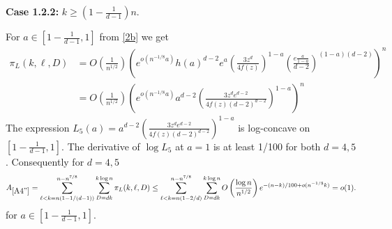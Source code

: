 \documentclass[11pt]{article}
\def\p{\pi}
\newcommand{\brac}[1]{\left(#1\right)}
\newcommand{\bfrac}[2]{\brac{\frac{#1}{#2}}}
\newcommand{\beq}[1]{\begin{equation}\label{#1}}
\newcommand{\eeq}{\end{equation}}
\begin{document}
{\bf Case 1.2.2:} $k\geq \brac{1-\frac{1}{d-1}}n$.

For $a\in[1-\frac{1}{d-1},1]$ from \eqref{2b} we get
\begin{align*}
\p_L(k,\ell,D)&=O\bfrac{1}{n^{1/2}}\brac{e^{o(n^{-1/8}a)}
h(a)^{d-2}e^a\bfrac{3z^d}{4f(z)}^{1-a}\bfrac{e\frac{a}{1-a}}{d-2}^{(1-a)(d-2)}}^n\nonumber\\
&=O\bfrac{1}{n^{1/2}}\brac{e^{o(n^{-1/8}a)}a^{d-2}\bfrac{3z^de^{d-2}}{4f(z)(d-2)^{d-2}}^{1-a}}^n
\end{align*}
The expression $L_5(a)=a^{d-2}\bfrac{3z^de^{d-2}}{4f(z)(d-2)^{d-2}}^{1-a}$ 
is log-concave on $[1-\frac{1}{d-1},1]$.  
The derivative of $\log L_5$ at $a=1$ is at least 1/100 for both $d=4,5$. Consequently for $d=4,5$
\beq{A4''}
A_{\ref{A4''}}=\sum_{\ell<k=n(1-1/(d-1))}^{n-n^{7/8}}\sum_{D=dk}^{k\log n}\p_L(k,\ell,D)\leq \sum_{\ell<k=n(1-2/d)}^{n-n^{7/8}}\sum_{D=dk}^{k\log n}
O\bfrac{\log n}{n^{1/2}}e^{-(n-k)/100+o(n^{-1/8}k)}=o(1).
\eeq
for $a\in [1-\frac{1}{d-1},1]$.
\end{document}
